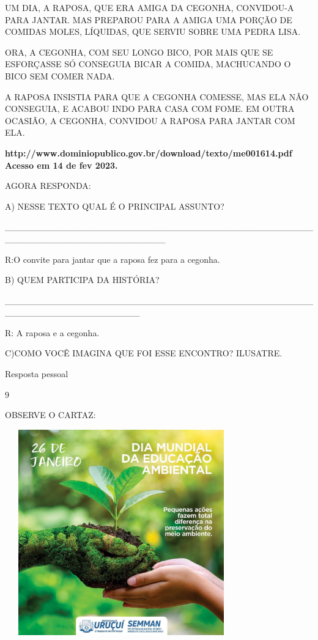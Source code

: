 {{{{{UM DIA, A RAPOSA, QUE ERA AMIGA DA CEGONHA, CONVIDOU-A PARA JANTAR. MAS
PREPAROU PARA A AMIGA UMA PORÇÃO DE COMIDAS MOLES, LÍQUIDAS, QUE SERVIU
SOBRE UMA PEDRA LISA.

ORA, A CEGONHA, COM SEU LONGO BICO, POR MAIS QUE SE ESFORÇASSE SÓ
CONSEGUIA BICAR A COMIDA, MACHUCANDO O BICO SEM COMER NADA.

A RAPOSA INSISTIA PARA QUE A CEGONHA COMESSE, MAS ELA NÃO CONSEGUIA, E
ACABOU INDO PARA CASA COM FOME. EM OUTRA OCASIÃO, A CEGONHA, CONVIDOU A
RAPOSA PARA JANTAR COM ELA.

\textbf{http://www.dominiopublico.gov.br/download/texto/me001614.pdf
Acesso em 14 de fev 2023.}

AGORA RESPONDA:

A) NESSE TEXTO QUAL É O PRINCIPAL ASSUNTO?

\_\_\_\_\_\_\_\_\_\_\_\_\_\_\_\_\_\_\_\_\_\_\_\_\_\_\_\_\_\_\_\_\_\_\_\_\_\_\_\_\_\_\_\_\_\_\_\_\_\_\_\_\_\_\_\_\_\_\_\_\_\_\_\_\_\_\_\_\_\_\_\_\_

R:O convite para jantar que a raposa fez para a cegonha.

B) QUEM PARTICIPA DA HISTÓRIA?

\_\_\_\_\_\_\_\_\_\_\_\_\_\_\_\_\_\_\_\_\_\_\_\_\_\_\_\_\_\_\_\_\_\_\_\_\_\_\_\_\_\_\_\_\_\_\_\_\_\_\_\_\_\_\_\_\_\_\_\_\_\_\_\_\_\_\_\_\_

R: A raposa e a cegonha.

C)COMO VOCÊ IMAGINA QUE FOI ESSE ENCONTRO? ILUSATRE.

Resposta pessoal

\num{9}

OBSERVE O CARTAZ:

\includegraphics[width=3.96154in,height=3.50028in]{media/image123.jpeg}

}}}}}
